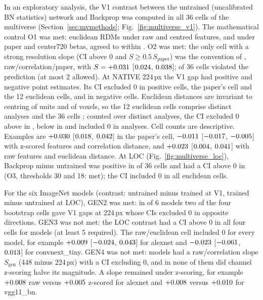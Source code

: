 In an exploratory analysis, the V1 contrast between the untrained (uncalibrated BN
statistics) network and Backprop was computed in all 36 cells of the multiverse
(Section~\ref{sec:mvmethods}; Fig.~\ref{fig:multiverse_v1}). The mathematical control O1 was met:
euclidean RDMs under raw and centred features, and under paper and center720 betas,
agreed to within \MultiOOneMaxDelta. O2 was met: the only cell with a strong resolution
slope (CI above 0 and $S \geq 0.5\,S_{\mathrm{paper}}$) was the convention of
\citet{evalres}, raw/correlation/paper, with $S = +0.031$
[$0.024$, $0.038$]; \MultiOTwoViolations{} of 36 cells violated
the prediction (at most 2 allowed). At NATIVE 224\,px the V1 gap had
\MultiSignPositive{} positive and \MultiSignNegative{} negative point estimates. Its CI
excluded 0 in \MultiPosCiCells{} positive cells, the paper's cell and the 12 euclidean
cells, and in \MultiNegCiCells{} negative cells. Euclidean distances are invariant to centring of units and of voxels, so the 12 euclidean cells comprise \MultiDistinctEucl{} distinct analyses and the 36 cells \MultiDistinct{}; counted over distinct analyses, the CI excluded 0 above in \MultiDistinctPos, below in \MultiDistinctNeg{} and included 0 in \MultiDistinctIncl{} analyses. Cell counts are descriptive. Examples are $+0.030$
[$0.018$, $0.042$] in the paper's cell,
$-0.011$ [$-0.017$, $-0.005$] with z-scored
features and correlation distance, and $+0.023$ [$0.004$,
$0.041$] with raw features and euclidean distance. At LOC
(Fig.~\ref{fig:multiverse_loc}), Backprop minus untrained was positive in
\MultiLocPositive{} of 36 cells and had a CI above 0 in \MultiLocCiPositive{} (O3,
thresholds 30 and 18: met); the CI included 0 in all euclidean cells.

For the six ImageNet models (contrast: untrained minus trained at V1, trained minus
untrained at LOC), GEN2 was met: in \GenTwoModels{} of 6 models two of the four bootstrap
cells gave V1 gaps at 224\,px whose CIs excluded 0 in opposite directions. GEN3 was not
met: the LOC contrast had a CI above 0 in all four cells for \GenThreeModels{} models
(at least 5 required). The raw/euclidean cell included 0 for every model, for example
$+0.009$ [$-0.024$, $0.043$] for
alexnet and $-0.023$ [$-0.061$,
$0.013$] for convnext\_tiny. GEN4 was not met: \GenFourQualified{}
models had a raw/correlation slope $S_{\mathrm{gen}}$ (448 minus 224\,px) with a CI
excluding 0, and in none of them did channel z-scoring halve its magnitude. A slope
remained under z-scoring, for example $+0.008$ raw versus
$+0.005$ z-scored for alexnet and $+0.008$ versus
$+0.010$ for vgg11\_bn.
